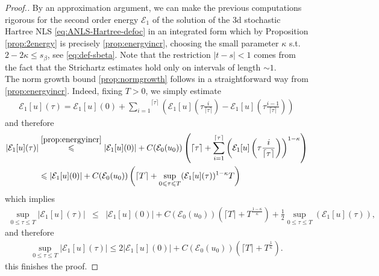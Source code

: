 \begin{proof}[Proof.]
  By an approximation argument, we can make the previous computations rigorous
  for the second order energy $\mathcal{E}_1$ of the solution of the 3d
  stochastic Hartree NLS \eqref{eq:ANLS-Hartree-defoc} in an integrated form
  which by Proposition \ref{prop:2energy} is precisely
  \eqref{prop:energyincr}, choosing the small parameter $\kappa$ s.t. $2 - 2
  \kappa \leqslant s_{\beta}$, see \eqref{eq:def-sbeta}. Note that the
  restriction $| t - s | < 1$ comes from the fact that the Strichartz
  estimates hold only on intervals of length $\sim 1$.\\
  
  The norm growth bound \eqref{prop:normgrowth} follows in a straightforward
  way from \eqref{prop:energyincr}. Indeed, fixing $T > 0$, we simply estimate
  \begin{align*}
    \mathcal{E}_1 [u] (\tau) =  \mathcal{E}_1 [u] (0) + \overset{\lceil
    \tau \rceil}{\underset{i = 1}{\sum}} \left( \mathcal{E}_1 [u] \left( \tau
    \frac{i}{\lceil \tau \rceil} \right) -\mathcal{E}_1 [u] \left( \tau
    \frac{i - 1}{\lceil \tau \rceil} \right) \right)
    \end{align*}
    and therefore
    \begin{align*}
        | \mathcal{E}_1 [u] (\tau) | &
    \overset{\eqref{prop:energyincr}}{\leqslant} | \mathcal{E}_1 [u] (0) | +
    C (\mathcal{E}_0 (u_0)) \left( \lceil \tau \rceil + \underset{i =
    1}{\overset{\lceil \tau \rceil}{\sum}} \left( \mathcal{E}_1 [u] \left(
    \tau \frac{i}{\lceil \tau \rceil} \right) \right)^{1 - \kappa} \right)\\
    & \leqslant | \mathcal{E}_1 [u] (0) | + C (\mathcal{E}_0 (u_0)) \left(
    \lceil T \rceil + \underset{0 \leqslant \tau \leqslant T}{\sup}
    (\mathcal{E}_1 [u] (\tau))^{1 - \kappa} T \right)
    \end{align*}
  which implies
  \begin{align*}
    \underset{0 \leqslant \tau \leqslant T}{\sup} | \mathcal{E}_1 [u] (\tau) |
    & \leqslant & | \mathcal{E}_1 [u] (0) | + C (\mathcal{E}_0 (u_0)) \left(
    \lceil T \rceil + T^{\frac{1 - \kappa}{\kappa}} \right) + \frac{1}{2}
    \underset{0 \leqslant \tau \leqslant T}{\sup} (\mathcal{E}_1 [u] (\tau)),
    \end{align*}
    and therefore
    \begin{align*}
        \underset{0 \leqslant \tau \leqslant T}{\sup} | \mathcal{E}_1 [u] (\tau) |
     \leqslant 2 | \mathcal{E}_1 [u] (0) | + C (\mathcal{E}_0 (u_0)) \left(
    \lceil T \rceil + T^{\frac{1}{\kappa}} \right) .
    \end{align*}
this finishes the proof.
\end{proof}

